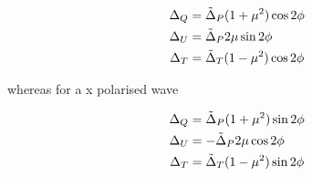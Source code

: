 \begin{equation}
\begin{split}
\Delta_Q  &= \Tilde{\Delta}_P(1+\mu^2)\cos2\phi\\
\Delta_U  &= \Tilde{\Delta}_P 2\mu\sin2\phi\\
\Delta_T  &= \Tilde{\Delta}_T(1-\mu^2)\cos2\phi
\end{split}
\end{equation}

whereas for a x polarised wave

\begin{equation}
\begin{split}
\Delta_Q  &= \Tilde{\Delta}_P(1+\mu^2)\sin2\phi\\
\Delta_U  &= -\Tilde{\Delta}_P2\mu\cos2\phi\\
\Delta_T  &= \Tilde{\Delta}_T(1-\mu^2)\sin2\phi
\end{split}
\end{equation}